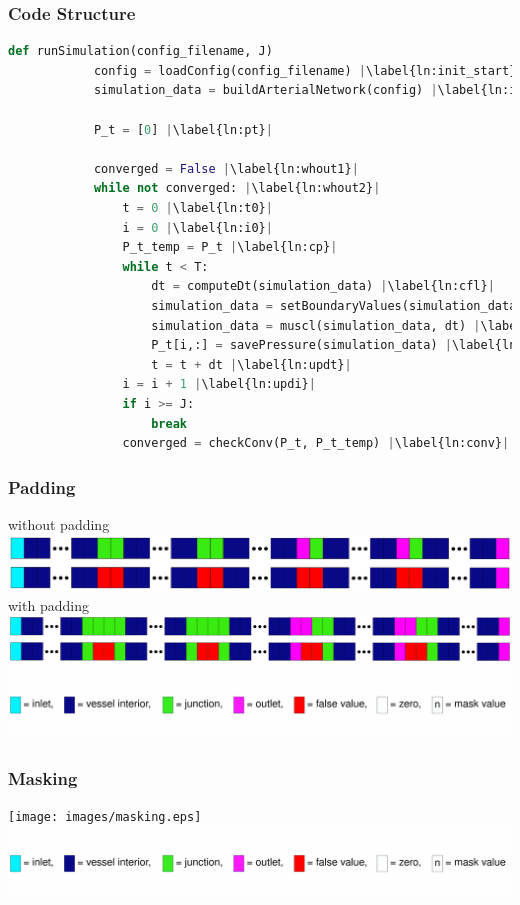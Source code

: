 \documentclass{beamer}
\begin{document}
\begin{frame} [fragile]
	\frametitle{Code Structure}
	\begin{lstlisting}[basicstyle=\fontsize{7}{7}\selectfont\ttfamily, language=Python, caption={$dt \hat{=}$timestep(CFL), setBoundaryValues$\hat{=}$inlet(from data), outlet(Windkessel),junctions(conservation laws), muscl$\hat{=}$Monotonic Upstream-centered Scheme for Conservation Laws(Finite Volume)}, label=lst:pc, escapechar=|] 
		def runSimulation(config_filename, J) 
			config = loadConfig(config_filename) |\label{ln:init_start}|
			simulation_data = buildArterialNetwork(config) |\label{ln:init_end}|

			P_t = [0] |\label{ln:pt}|

			converged = False |\label{ln:whout1}|
			while not converged: |\label{ln:whout2}|
				t = 0 |\label{ln:t0}|
				i = 0 |\label{ln:i0}|
				P_t_temp = P_t |\label{ln:cp}|
				while t < T:
					dt = computeDt(simulation_data) |\label{ln:cfl}|
					simulation_data = setBoundaryValues(simulation_data, dt) |\label{ln:bv    }|
					simulation_data = muscl(simulation_data, dt) |\label{ln:muscl}|
					P_t[i,:] = savePressure(simulation_data) |\label{ln:svp}|
					t = t + dt |\label{ln:updt}|
				i = i + 1 |\label{ln:updi}|
				if i >= J:
					break
				converged = checkConv(P_t, P_t_temp) |\label{ln:conv}|
\end{lstlisting}
\end{frame}
\begin{frame}
	\frametitle{Padding}
	without padding
	\includegraphics[width=\textwidth]{images/padding1.eps}
	with padding
	\includegraphics[width=\textwidth]{images/padding2.eps}
	\includegraphics[width=\textwidth]{images/legend.eps}
\end{frame}
\begin{frame}
	\frametitle{Masking}
	\texttt{[image: images/masking.eps]}
	\includegraphics[width=\textwidth]{images/legend.eps}
\end{frame}
\end{document}
